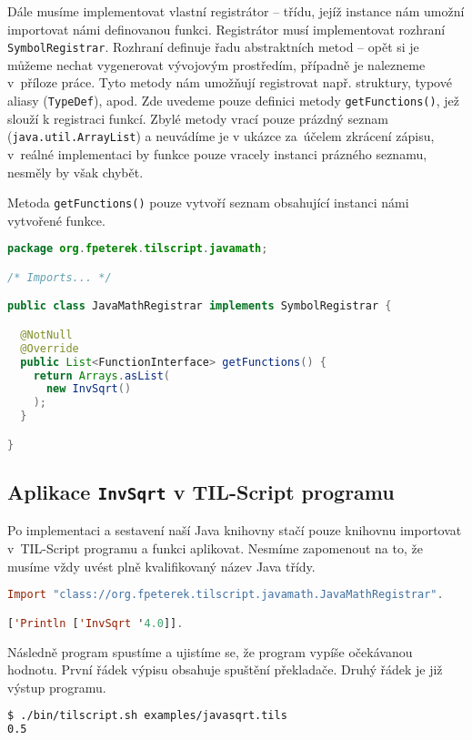 Dále musíme implementovat vlastní registrátor -- třídu, jejíž instance nám umožní importovat
námi definovanou funkci. Registrátor musí implementovat rozhraní
\lstinline{SymbolRegistrar}. Rozhraní definuje řadu abstraktních metod -- opět si je můžeme nechat
vygenerovat vývojovým prostředím, případně je nalezneme v~příloze práce. Tyto metody nám umožňují
registrovat např. struktury, typové aliasy (\lstinline{TypeDef}), apod. Zde uvedeme pouze definici
metody \lstinline{getFunctions()}, jež slouží k registraci funkcí. Zbylé metody vrací pouze prázdný
seznam (\lstinline{java.util.ArrayList}) a neuvádíme je v ukázce za~účelem zkrácení zápisu, v~reálné
implementaci by funkce pouze vracely instanci prázného seznamu, nesměly by však chybět.

Metoda \lstinline{getFunctions()} pouze vytvoří seznam obsahující instanci námi vytvořené funkce.

\begin{lstlisting}[caption={Java registrátor}, language=Java]
package org.fpeterek.tilscript.javamath;

/* Imports... */

public class JavaMathRegistrar implements SymbolRegistrar {

  @NotNull
  @Override
  public List<FunctionInterface> getFunctions() {
    return Arrays.asList(
      new InvSqrt()
    );
  }

}
\end{lstlisting}

\subsection{Aplikace \lstinline{InvSqrt} v TIL-Script programu}

Po implementaci a sestavení naší Java knihovny stačí pouze knihovnu importovat v~TIL-Script
programu a funkci aplikovat. Nesmíme zapomenout na to, že musíme vždy uvést plně kvalifikovaný název
Java třídy.

\begin{lstlisting}[caption={Aplikace InvSqrt}, language=Haskell]
Import "class://org.fpeterek.tilscript.javamath.JavaMathRegistrar".

['Println ['InvSqrt '4.0]].
\end{lstlisting}

Následně program spustíme a ujistíme se, že program vypíše očekávanou hodnotu. První řádek výpisu
obsahuje spuštění překladače. Druhý řádek je již výstup programu.

\begin{lstlisting}[caption={Aplikace InvSqrt}, language=Bash]
$ ./bin/tilscript.sh examples/javasqrt.tils
0.5
\end{lstlisting}

\endinput
